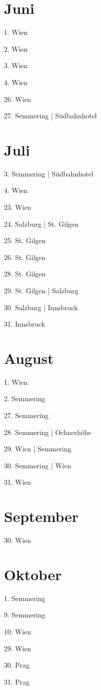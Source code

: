 \documentclass[twoside=false,titlepage=false,open=any, parskip=never, fontsize=10pt, headings=small, chapterprefix=false, appendixprefix=false, DIV=15]{scrbook}
\begin{document}
\begin{multicols}{3}
            \section*{Juni}
            1. Wien\par
            2. Wien\par
            3. Wien\par
            4. Wien\par
            26. Wien\par
            27. Semmering | Südbahnhotel\par
            \section*{Juli}
            3. Semmering | Südbahnhotel\par
            4. Wien\par
            23. Wien\par
            24. Salzburg | St. Gilgen\par
            25. St. Gilgen\par
            26. St. Gilgen\par
            28. St. Gilgen\par
            29. St. Gilgen | Salzburg\par
            30. Salzburg | Innsbruck\par
            31. Innsbruck\par
            \section*{August}
            1. Wien\par
            2. Semmering\par
            27. Semmering\par
            28. Semmering | Ochnerhöhe\par
            29. Wien | Semmering\par
            30. Semmering | Wien\par
            31. Wien\par
            \section*{September}
            30. Wien\par
            \section*{Oktober}
            1. Semmering\par
            9. Semmering\par
            10. Wien\par
            29. Wien\par
            30. Prag\par
            31. Prag\par

\end{multicols}
\end{document}
